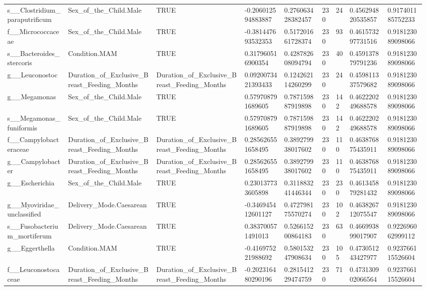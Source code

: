 \begin{longtable}{lllllllll}
s\_\_Clostridium\_paraputrificum & Sex\_of\_the\_Child.Male & TRUE & -0.206012594883887 & 0.276063428382457 & 230 & 24 & 0.456294820535857 & 0.917401185752233 \\
f\_\_Micrococcaceae & Sex\_of\_the\_Child.Male & TRUE & -0.381447693532353 & 0.517201661728374 & 230 & 93 & 0.461573297731516 & 0.918123089098066 \\
s\_\_Bacteroides\_stercoris & Condition.MAM & TRUE & 0.317960516900354 & 0.428782608094794 & 230 & 40 & 0.459137879791236 & 0.918123089098066 \\
g\_\_Leuconostoc & Duration\_of\_Exclusive\_Breast\_Feeding\_Months & Duration\_of\_Exclusive\_Breast\_Feeding\_Months & 0.0920073421393433 & 0.124262114260299 & 230 & 24 & 0.459811337579682 & 0.918123089098066 \\
g\_\_Megamonas & Sex\_of\_the\_Child.Male & TRUE & 0.579708791689605 & 0.787159887919898 & 230 & 142 & 0.462220249688578 & 0.918123089098066 \\
s\_\_Megamonas\_funiformis & Sex\_of\_the\_Child.Male & TRUE & 0.579708791689605 & 0.787159887919898 & 230 & 142 & 0.462220249688578 & 0.918123089098066 \\
f\_\_Campylobacteraceae & Duration\_of\_Exclusive\_Breast\_Feeding\_Months & Duration\_of\_Exclusive\_Breast\_Feeding\_Months & 0.285626551658495 & 0.389279938017602 & 230 & 110 & 0.463876875435911 & 0.918123089098066 \\
g\_\_Campylobacter & Duration\_of\_Exclusive\_Breast\_Feeding\_Months & Duration\_of\_Exclusive\_Breast\_Feeding\_Months & 0.285626551658495 & 0.389279938017602 & 230 & 110 & 0.463876875435911 & 0.918123089098066 \\
g\_\_Escherichia & Sex\_of\_the\_Child.Male & TRUE & 0.230137733605898 & 0.311883241446344 & 230 & 230 & 0.461345879281432 & 0.918123089098066 \\
g\_\_Myoviridae\_unclassified & Delivery\_Mode.Caesarean & TRUE & -0.346945412601127 & 0.472798175570274 & 230 & 102 & 0.463826712075547 & 0.918123089098066 \\
s\_\_Fusobacterium\_mortiferum & Delivery\_Mode.Caesarean & TRUE & 0.383700571491013 & 0.526615200864183 & 230 & 63 & 0.466993899017907 & 0.922696062999112 \\
g\_\_Eggerthella & Condition.MAM & TRUE & -0.416975221988692 & 0.580153247908634 & 230 & 105 & 0.473051243427977 & 0.923766115526604 \\
f\_\_Leuconostocaceae & Duration\_of\_Exclusive\_Breast\_Feeding\_Months & Duration\_of\_Exclusive\_Breast\_Feeding\_Months & -0.202316480290196 & 0.281541229474759 & 230 & 71 & 0.473130902066564 & 0.923766115526604 \\

\end{longtable}
